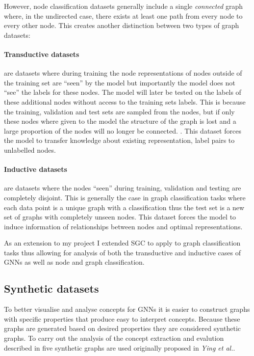 However, node classification datasets generally include a single \emph{connected} graph where, in the undirected case, there exists at least one path from every node to every other node.
This creates another distinction between two types of graph datasets:

\paragraph{Transductive datasets} are datasets where during training the node representations of nodes outside of the training set are ``seen'' by the model but importantly the model does not ``see'' the labels for these nodes.
The model will later be tested on the labels of these additional nodes without access to the training sets labels.
This is because the training, validation and test sets are sampled from the nodes, but if only these nodes where given to the model the structure of the graph is lost and a large proportion of the nodes will no longer be connected.
.
This dataset forces the model to transfer knowledge about existing representation, label pairs to unlabelled nodes.

\paragraph{Inductive datasets} are datasets where the nodes ``seen'' during training, validation and testing are completely disjoint.
This is generally the case in graph classification tasks where each data point is a unique graph with a classification thus the test set is a new set of graphs with completely unseen nodes.
This dataset forces the model to induce information of relationships between nodes and optimal representations.

As an extension to my project I extended SGC to apply to graph classification tasks thus allowing for analysis of both the transductive and inductive cases of GNNs as well as node and graph classification.

\subsection{Synthetic datasets}
\label{sec:synth}


To better visualise and analyse concepts for GNNs it is easier to construct graphs with specific properties that produce easy to interpret concepts.
Because these graphs are generated based on desired properties they are considered synthetic graphs.
To carry out the analysis of the concept extraction and evalution described in  five synthetic graphs are used originally proposed in \textit{Ying et al.}\cite{ying2019gnnexplainer}.

